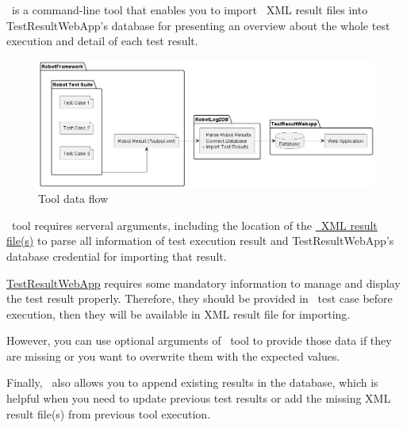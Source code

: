 



\pkg\ is a command-line tool that enables you to import \rfwcore\ XML result 
files into TestResultWebApp's database for presenting an overview about the 
whole test execution and detail of each test result.

\begin{figure}[h!]
   \includegraphics[width=1\linewidth]{./pictures/data_flow.png}
   \caption{Tool data flow}
\end{figure}

\pkg\ tool requires serveral arguments, including the location of the
\href{https://robotframework.org/robotframework/latest/RobotFrameworkUserGuide.html#output-file}
{\rfwcore\ XML result file(s)} to parse all information of test execution result 
and TestResultWebApp's database credential for importing that result.

\href{https://github.com/test-fullautomation/testresultwebapp}{TestResultWebApp} 
requires some mandatory information to manage and display the test result properly. 
Therefore, they should be provided in \rfwcore\ test case before execution, then 
they will be available in XML result file for importing.

However, you can use optional arguments of \pkg\ tool to provide those data 
if they are missing or you want to overwrite them with the expected values.

Finally, \pkg\ also allows you to append existing results in the database, which 
is helpful when you need to update previous test results or add the missing 
XML result file(s) from previous tool execution.

